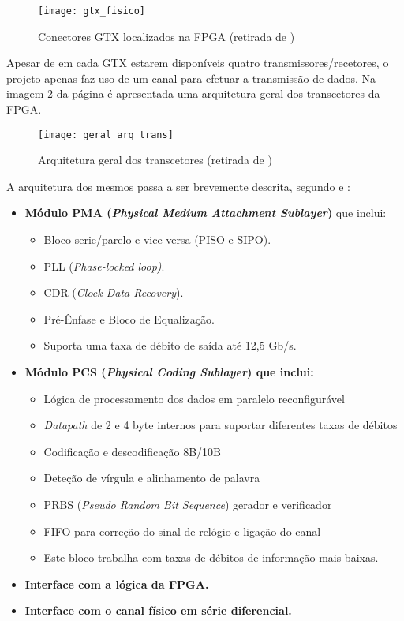 \begin{figure}[h!]
	\begin{center}
		\leavevmode
		\texttt{[image: gtx\_fisico]}
		\caption[Conectores GTX localizados na FPGA]{Conectores GTX localizados na FPGA (retirada de \cite{R008})}
		\label{fig:gtx_fis}
	\end{center}
\end{figure}

Apesar de em cada GTX estarem disponíveis quatro transmissores/recetores, o projeto apenas faz uso de um canal para efetuar a transmissão de dados. Na imagem \ref{fig:gtx_geral_arq} da página \pageref{fig:gtx_geral_arq} é apresentada uma arquitetura geral dos transcetores da FPGA.

\begin{figure}[h!]
	\begin{center}
		\leavevmode
		\texttt{[image: geral\_arq\_trans]}
		\caption[Arquitetura geral dos transcetores]{Arquitetura geral dos transcetores (retirada de \cite{R010})}
		\label{fig:gtx_geral_arq}
	\end{center}
\end{figure}


A arquitetura dos mesmos passa a ser brevemente descrita, segundo \cite{R010} e \cite{R011}:
\begin{itemize}
	\item \textbf{Módulo PMA (\textit{Physical Medium Attachment Sublayer})} que inclui:
	\begin{itemize}
		\item Bloco serie/parelo e vice-versa (PISO e SIPO).
		\item PLL (\textit{Phase-locked loop)}.
		\item CDR (\textit{Clock Data Recovery}).
		\item Pré-Ênfase e Bloco de Equalização.
		\item Suporta uma taxa de débito de saída até 12,5 Gb/s.
		\end{itemize}
	\item \textbf{Módulo PCS (\textit{Physical Coding Sublayer}) que inclui:}
	\begin{itemize}
		\item Lógica de processamento dos dados em paralelo reconfigurável
		\item \textit{Datapath} de 2 e 4 byte internos para suportar diferentes taxas de débitos
		\item Codificação e descodificação 8B/10B
		\item Deteção de vírgula e alinhamento de palavra
		\item PRBS (\textit{Pseudo Random Bit Sequence}) gerador e verificador
		\item FIFO para correção do sinal de relógio e ligação do canal
		\item Este bloco trabalha com taxas de débitos de informação mais baixas.
	\end{itemize}
	\item \textbf{Interface com a lógica da FPGA.}
	\item \textbf{Interface com o canal físico em série diferencial.}
\end{itemize}

